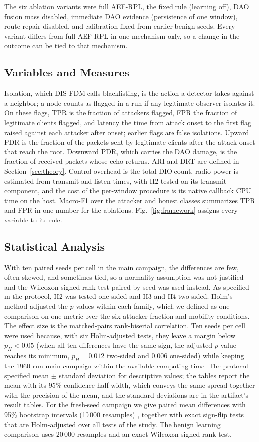 The six ablation variants were full AEF-RPL, the fixed rule (learning off), DAO fusion mass disabled, immediate DAO evidence (persistence of one window), route repair disabled, and calibration fixed from earlier benign seeds. Every variant differs from full AEF-RPL in one mechanism only, so a change in the outcome can be tied to that mechanism.

\subsection{Variables and Measures}
Isolation, which DIS-FDM calls blacklisting, is the action a detector takes against a neighbor; a node counts as flagged in a run if any legitimate observer isolates it. On these flags, TPR is the fraction of attackers flagged, FPR the fraction of legitimate clients flagged, and latency the time from attack onset to the first flag raised against each attacker after onset; earlier flags are false isolations. Upward PDR is the fraction of the packets sent by legitimate clients after the attack onset that reach the root. Downward PDR, which carries the DAO damage, is the fraction of received packets whose echo returns. ARI and DRT are defined in Section~\ref{sec:theory}. Control overhead is the total DIO count, radio power is estimated from transmit and listen times, with H2 tested on its transmit component, and the cost of the per-window procedure is its native callback CPU time on the host. Macro-F1 over the attacker and honest classes summarizes TPR and FPR in one number for the ablations. Fig.~\ref{fig:framework} assigns every variable to its role.

\subsection{Statistical Analysis}
With ten paired seeds per cell in the main campaign, the differences are few, often skewed, and sometimes tied, so a normality assumption was not justified and the Wilcoxon signed-rank test \cite{wilcoxon1945} paired by seed was used instead. As specified in the protocol, H2 was tested one-sided and H3 and H4 two-sided. Holm's method \cite{aickin1996} adjusted the $p$-values within each family, which we defined as one comparison on one metric over the six attacker-fraction and mobility conditions. The effect size is the matched-pairs rank-biserial correlation. Ten seeds per cell were used because, with six Holm-adjusted tests, they leave a margin below $p_H<0.05$ (when all ten differences have the same sign, the adjusted $p$-value reaches its minimum, $p_H=0.012$ two-sided and 0.006 one-sided) while keeping the 1960-run main campaign within the available computing time. The protocol specified mean $\pm$ standard deviation for descriptive values; the tables report the mean with its 95\% confidence half-width, which conveys the same spread together with the precision of the mean, and the standard deviations are in the artifact's result tables. For the fresh-seed campaign we give paired mean differences with 95\% bootstrap intervals (10\,000 resamples) \cite{efron1994}, together with exact sign-flip tests that are Holm-adjusted over all tests of the study. The benign learning comparison uses 20\,000 resamples and an exact Wilcoxon signed-rank test.

